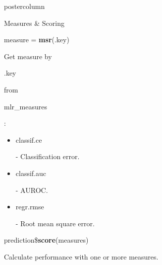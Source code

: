 \documentclass{beamer}
\newcommand{\codeinline}[1]{\begin{codeboxinline}#1\end{codeboxinline}}
\begin{document}
\begin{frame}[fragile]{}
\begin{columns}
\begin{column}{.245\textwidth}
\begin{beamercolorbox}[center]{postercolumn}
\begin{minipage}{.98\textwidth}
{\begin{myblock}{Measures \& Scoring}
\begin{codebox}
								measure = \textbf{msr}(.key)
							\end{codebox}
							Get measure by \codeinline{.key} from \codeinline{mlr\_measures}:
							\begin{itemize}
								\item \codeinline{classif.ce} - Classification error.
								\item \codeinline{classif.auc} - AUROC.
								\item \codeinline{regr.rmse} - Root mean square error.
							\end{itemize}
							\vspace{1em}
							\begin{codebox}
								prediction\$\textbf{score}(measures)
							\end{codebox}
							Calculate performance with one or more measures.
						\end{myblock}
					\vfill}
				\end{minipage}
			\end{beamercolorbox}
		\end{column}
	\end{columns}
\end{frame}
\end{document}
